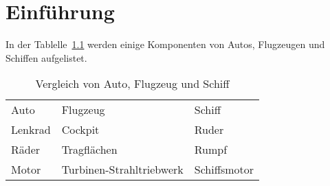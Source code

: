 \documentclass[12pt,a4paper,final]{scrbook}
\begin{document}
\chapter{Einführung}
In der Tablelle~\ref{VergleichAFS} werden einige Komponenten von Autos, Flugzeugen und Schiffen aufgelistet.

\begin{table}[htb]
\centering
\begin{tabularx}{10cm}{XXX}
	Auto    & Flugzeug    & Schiff \\
	Lenkrad & Cockpit     & Ruder \\
	Räder   & Tragflächen & Rumpf \\
	Motor   & Turbinen-Strahltriebwerk & Schiffsmotor \\
\end{tabularx} 
\caption{Vergleich von Auto, Flugzeug und Schiff}
\label{VergleichAFS}
\end{table} 
\end{document}
